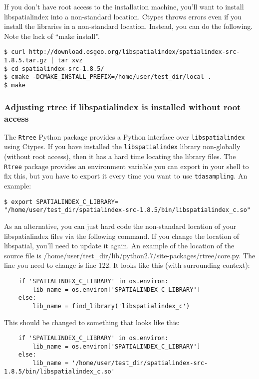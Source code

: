 \documentclass[11pt]{article}
\begin{document}
If you don't have root access to the installation machine, you'll want to install libspatialindex into a non-standard location. Ctypes throws errors even if you install the libraries in a non-standard location. Instead, you can do the following. Note the lack of ``make install''.

\begin{verbatim} 
$ curl http://download.osgeo.org/libspatialindex/spatialindex-src-1.8.5.tar.gz | tar xvz
$ cd spatialindex-src-1.8.5/
$ cmake -DCMAKE_INSTALL_PREFIX=/home/user/test_dir/local .
$ make 
\end{verbatim} 


\subsubsection{Adjusting rtree if libspatialindex is installed without root access}
The \texttt{Rtree} Python package provides a Python interface over \texttt{libspatialindex} using Ctypes. If you have installed the \texttt{libspatialindex} library non-globally (without root access), then it has a hard time locating the library files. The \texttt{Rtree} package provides an environment variable you can export in your shell to fix this, but you have to export it every time you want to use \texttt{tdasampling}. An example: 

\begin{verbatim} 
$ export SPATIALINDEX_C_LIBRARY=
"/home/user/test_dir/spatialindex-src-1.8.5/bin/libspatialindex_c.so"
\end{verbatim} 

As an alternative, you can just hard code the non-standard location of your libspatialindex files via the following command. If you change the location of libspatial, you'll need to update it again. An example of the location of the source file is /home/user/test\_dir/lib/python2.7/site-packages/rtree/core.py. The line you need to change is line 122. It looks like this (with surrounding context):

\begin{verbatim} 
    if 'SPATIALINDEX_C_LIBRARY' in os.environ:
        lib_name = os.environ['SPATIALINDEX_C_LIBRARY']
    else:
        lib_name = find_library('libspatialindex_c')
\end{verbatim} 

This should be changed to something that looks like this: 

\begin{verbatim} 
    if 'SPATIALINDEX_C_LIBRARY' in os.environ:
        lib_name = os.environ['SPATIALINDEX_C_LIBRARY']
    else:
        lib_name = '/home/user/test_dir/spatialindex-src-1.8.5/bin/libspatialindex_c.so'
\end{verbatim} 
\end{document}
